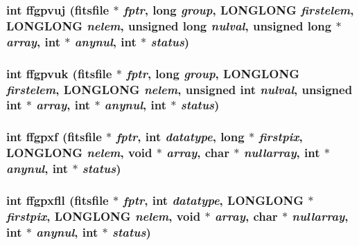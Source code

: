 \subsubsection{\setlength{\rightskip}{0pt plus 5cm}int ffgpvuj (\bf{fitsfile} $\ast$ {\em fptr}, long {\em group}, \bf{LONGLONG} {\em firstelem}, \bf{LONGLONG} {\em nelem}, unsigned long {\em nulval}, unsigned long $\ast$ {\em array}, int $\ast$ {\em anynul}, int $\ast$ {\em status})}\label{test_2roimasker_2fitsio_8h_d3a92390525cbe896595a5e30e2c31cb}


\subsubsection{\setlength{\rightskip}{0pt plus 5cm}int ffgpvuk (\bf{fitsfile} $\ast$ {\em fptr}, long {\em group}, \bf{LONGLONG} {\em firstelem}, \bf{LONGLONG} {\em nelem}, unsigned int {\em nulval}, unsigned int $\ast$ {\em array}, int $\ast$ {\em anynul}, int $\ast$ {\em status})}\label{test_2roimasker_2fitsio_8h_9d63a49944e89d4debca1080067ca58f}


\subsubsection{\setlength{\rightskip}{0pt plus 5cm}int ffgpxf (\bf{fitsfile} $\ast$ {\em fptr}, int {\em datatype}, long $\ast$ {\em firstpix}, \bf{LONGLONG} {\em nelem}, void $\ast$ {\em array}, char $\ast$ {\em nullarray}, int $\ast$ {\em anynul}, int $\ast$ {\em status})}\label{test_2roimasker_2fitsio_8h_64917e68aaefb305612dd26f21565443}


\subsubsection{\setlength{\rightskip}{0pt plus 5cm}int ffgpxfll (\bf{fitsfile} $\ast$ {\em fptr}, int {\em datatype}, \bf{LONGLONG} $\ast$ {\em firstpix}, \bf{LONGLONG} {\em nelem}, void $\ast$ {\em array}, char $\ast$ {\em nullarray}, int $\ast$ {\em anynul}, int $\ast$ {\em status})}\label{test_2roimasker_2fitsio_8h_1695916e97fed43202efca40fd7fd573}


